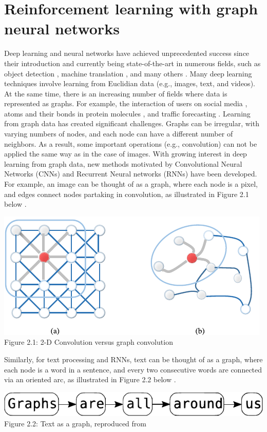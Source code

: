 \chapter{Reinforcement learning with graph neural networks}
\label{chap:math}

Deep learning and neural networks have achieved unprecedented success since their introduction and currently being state-of-the-art in numerous fields, such as object detection \cite{DBLP:journals/corr/RedmonDGF15, 10.1109/IVS.2019.8813777, 8627998}, machine translation \cite{DBLP:journals/corr/LuongPM15, 8003957, DBLP:journals/corr/abs-2002-07526}, and many others \cite{DONG2021100379, 10.1145/3505243, PICCIALLI2021111}. Many deep learning techniques involve learning from Euclidian data (e.g., images, text, and videos). At the same time, there is an increasing number of fields where data is represented as graphs. For example, the interaction of users on social media \cite{10.1145/3308558.3313488}, atoms and their bonds in protein molecules \cite{strokach2020fast}, and traffic forecasting \cite{JIANG2022117921}. Learning from graph data has created significant challenges. Graphs can be irregular, with varying numbers of nodes, and each node can have a different number of neighbors. As a result, some important operations (e.g., convolution) can not be applied the same way as in the case of images. With growing interest in deep learning from graph data, new methods motivated by Convolutional Neural Networks (CNNs) and Recurrent Neural networks (RNNs) have been developed. For example, an image can be thought of as a graph, where each node is a pixel, and edges connect nodes partaking in convolution, as illustrated in Figure 2.1 below \cite{9046288}.\\
\begin{center}
    \includegraphics[width=0.6\linewidth]{images/image_vs_graph.pdf}\\
    Figure 2.1: 2-D Convolution versus graph convolution \cite{9046288}
\end{center}
\newpage
Similarly, for text processing and RNNs, text can be thought of as a graph, where each node is a word in a sentence, and every two consecutive words are connected via an oriented arc, as illustrated in Figure 2.2 below \cite{sanchez-lengeling2021a}.
\begin{center}
    \includegraphics[width=0.7\linewidth]{images/graph_are_all_around_us.pdf}\\
    Figure 2.2: Text as a graph, reproduced from \cite{sanchez-lengeling2021a}
\end{center}


